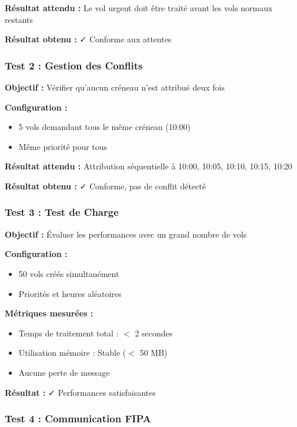\documentclass[12pt,a4paper]{article}
\begin{document}
\textbf{Résultat attendu :} Le vol urgent doit être traité avant les vols normaux restants

\textbf{Résultat obtenu :} ✓ Conforme aux attentes

\subsubsection{Test 2 : Gestion des Conflits}

\textbf{Objectif :} Vérifier qu'aucun créneau n'est attribué deux fois

\textbf{Configuration :}
\begin{itemize}
    \item 5 vols demandant tous le même créneau (10:00)
    \item Même priorité pour tous
\end{itemize}

\textbf{Résultat attendu :} Attribution séquentielle à 10:00, 10:05, 10:10, 10:15, 10:20

\textbf{Résultat obtenu :} ✓ Conforme, pas de conflit détecté

\subsubsection{Test 3 : Test de Charge}

\textbf{Objectif :} Évaluer les performances avec un grand nombre de vols

\textbf{Configuration :}
\begin{itemize}
    \item 50 vols créés simultanément
    \item Priorités et heures aléatoires
\end{itemize}

\textbf{Métriques mesurées :}
\begin{itemize}
    \item Temps de traitement total : $<$ 2 secondes
    \item Utilisation mémoire : Stable ($<$ 50 MB)
    \item Aucune perte de message
\end{itemize}

\textbf{Résultat :} ✓ Performances satisfaisantes

\subsubsection{Test 4 : Communication FIPA}
\end{document}
